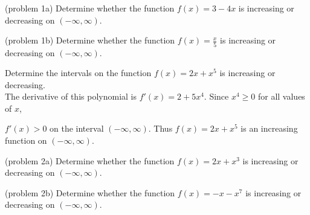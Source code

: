 \documentclass{ximera}
\begin{document}
\begin{problem}(problem 1a)
Determine whether the function $f(x) = 3 - 4x$ is increasing or decreasing on $(-\infty, \infty)$.\\
\begin{multipleChoice}
\end{multipleChoice}
\end{problem}

\begin{problem}(problem 1b)
Determine whether the function $f(x) = \frac{x}{5}$ is increasing or decreasing on $(-\infty, \infty)$.\\
\begin{multipleChoice}
\end{multipleChoice}
\end{problem}


\begin{example}[example 2]
Determine the intervals on the function $f(x) = 2x + x^5$ is increasing or decreasing.\\
The derivative of this polynomial is $f'(x) = 2 + 5x^4$. Since $x^4 \geq 0$ for all values of $x$, 

$f'(x) > 0$ on the interval $(-\infty, \infty)$. Thus $f(x) = 2x + x^5$ is an increasing function on $(-\infty, \infty)$.

\end{example}

\begin{problem}(problem 2a)
Determine whether the function $f(x) = 2x + x^3$ is increasing or decreasing on $(-\infty, \infty)$.\\
\begin{multipleChoice}
\end{multipleChoice}
\end{problem}

\begin{problem}(problem 2b)
Determine whether the function $f(x) = -x - x^7$ is increasing or decreasing on $(-\infty, \infty)$.\\
\begin{multipleChoice}
\end{multipleChoice}
\end{problem}
\end{document}
